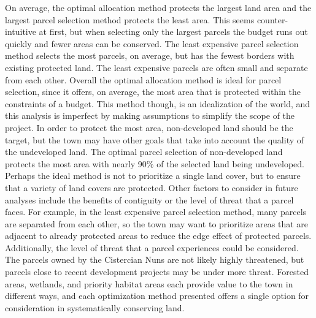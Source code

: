 \documentclass[12pt, stu, floatsintext,table]{apa7}
\begin{document}
On average, the optimal allocation method protects the largest land area and the largest parcel selection method protects the least area. This seems counter-intuitive at first, but when selecting only the largest parcels the budget runs out quickly and fewer areas can be conserved. The least expensive parcel selection method selects the most parcels, on average, but has the fewest borders with existing protected land. The least expensive parcels are often small and separate from each other.  
Overall the optimal allocation method is ideal for parcel selection, since it offers, on average, the most area that is protected within the constraints of a budget. This method though, is an idealization of the world, and this analysis is imperfect by making assumptions to simplify the scope of the project. In order to protect the most area, non-developed land should be the target, but the town may have other goals that take into account the quality of the undeveloped land. The optimal parcel selection of non-developed land protects the most area with nearly 90\% of the selected land being undeveloped. Perhaps the ideal method is not to prioritize a single land cover, but to ensure that a variety of land covers are protected. Other factors to consider in future analyses include the benefits of contiguity or the level of threat that a parcel faces. For example, in the least expensive parcel selection method, many parcels are separated from each other, so the town may want to prioritize areas that are adjacent to already protected areas to reduce the edge effect of protected parcels. Additionally, the level of threat that a parcel experiences could be considered. The parcels owned by the Cistercian Nuns are not likely highly threatened, but parcels close to recent development projects may be under more threat. Forested areas, wetlands, and priority habitat areas each provide value to the town in different ways, and each optimization method presented offers a single option for consideration in systematically conserving land. 

\end{document}
